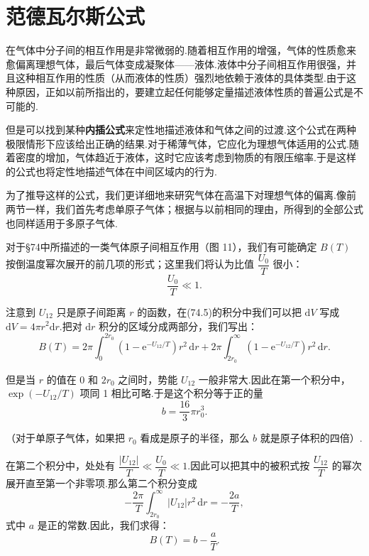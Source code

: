 \section{范德瓦尔斯公式}

在气体中分子间的相互作用是非常微弱的.随着相互作用的增强，气体的性质愈来愈偏离理想气体，最后气体变成凝聚体——液体.液体中分子间相互作用很强，并且这种相互作用的性质（从而液体的性质）强烈地依赖于液体的具体类型.由于这种原因，正如以前所指出的，要建立起任何能够定量描述液体性质的普遍公式是不可能的.

但是可以找到某种\textbf{内插公式}来定性地描述液体和气体之间的过渡.这个公式在两种极限情形下应该给出正确的结果.对于稀薄气体，它应化为理想气体适用的公式.随着密度的增加，气体趋近于液体，这时它应该考虑到物质的有限压缩率.于是这样的公式也将定性地描述气体在中间区域内的行为.

为了推导这样的公式，我们更详细地来研究气体在高温下对理想气体的偏离.像前两节一样，我们首先考虑单原子气体；根据与以前相同的理由，所得到的全部公式也同样适用于多原子气体.

对于§74中所描述的一类气体原子间相互作用（图 11），我们有可能确定 $B(T)$ 按倒温度幂次展开的前几项的形式；这里我们将认为比值 $\dfrac{U_0}{T}$ 很小：
\begin{equation}
  \frac{U_0}{T}\ll1.
\end{equation}

注意到 $U_{12}$ 只是原子间距离 $r$ 的函数，在(74.5)的积分中我们可以把 $\mathrm{d}V$ 写成 $\mathrm{d}V=4\pi r^2\mathrm{d}r$.把对 $\mathrm{d}r$ 积分的区域分成两部分，我们写出：
\begin{equation*}
  B(T)=2\pi\int_0^{2r_0}\left(1-\mathrm{e}^{-U_{12}/T}\right)r^2\,\mathrm{d}r
  +2\pi\int_{2r_0}^{\infty}\left(1-\mathrm{e}^{-U_{12}/T}\right)r^2\,\mathrm{d}r.
\end{equation*}

但是当 $r$ 的值在 0 和 $2r_0$ 之间时，势能 $U_{12}$ 一般非常大.因此在第一个积分中，$\exp(-U_{12}/T)$ 项同 1 相比可略.于是这个积分等于正的量
\begin{equation*}
  b=\frac{16}{3}\pi r_0^3.
\end{equation*}

（对于单原子气体，如果把 $r_0$ 看成是原子的半径，那么 $b$ 就是原子体积的四倍）.

在第二个积分中，处处有 $\dfrac{|U_{12}|}{T}\ll\dfrac{U_0}{T}\ll1$.因此可以把其中的被积式按 $\dfrac{U_{12}}{T}$ 的幂次展开直至第一个非零项.那么第二个积分变成
\begin{equation*}
  -\frac{2\pi}{T}\int_{2r_0}^{\infty}\left|U_{12}\right|r^2\,\mathrm{d}r=-\frac{2a}{T},
\end{equation*}
式中 $a$ 是正的常数.因此，我们求得：
\begin{equation}
  B(T)=b-\frac{a}{T}.
\end{equation}

